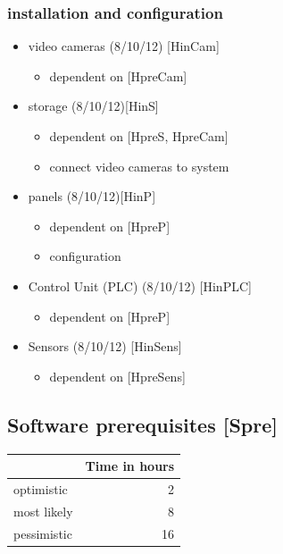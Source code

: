 \subsubsection{installation and configuration}
\label{sec:org7c12187}
\begin{itemize}
\item video cameras (8/10/12) [HinCam] 
	\begin{itemize}
	\item dependent on [HpreCam]
	\end{itemize}
\item storage  (8/10/12)[HinS]
	\begin{itemize}
	\item dependent on [HpreS, HpreCam]
	\item connect video cameras to system
	\end{itemize}
\item panels (8/10/12)[HinP]
	\begin{itemize}
	\item dependent on [HpreP]
	\item configuration
	\end{itemize}
\item Control Unit (PLC) (8/10/12) [HinPLC]
	\begin{itemize}
	\item dependent on [HpreP]
	\end{itemize}
\item Sensors (8/10/12) [HinSens]
	\begin{itemize}
	\item dependent on [HpreSens]
	\end{itemize}
\end{itemize}

\subsection{Software prerequisites [Spre]}
\label{sec:org180caa5}

\begin{center}
\begin{tabular}{|l|r|}
	\hline
	& Time in hours\\
	\hline
	optimistic & 2\\
	\hline
	most likely & 8\\
	\hline
	pessimistic & 16\\
	\hline
\end{tabular}
\end{center}

